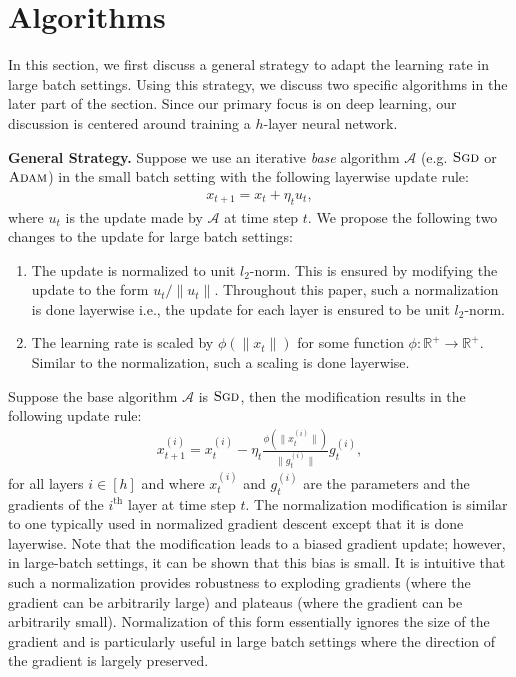 \documentclass{article} \usepackage{iclr2020_conference,times}
\newcommand{\sgd}{\textsc{Sgd}\xspace}
\newcommand{\adam}{\textsc{Adam}}
\begin{document}
\section{Algorithms}


In this section, we first discuss a general strategy to adapt the learning rate in large batch settings.  Using this strategy, we discuss two specific algorithms in the later part of the section. Since our primary focus is on deep learning, our discussion is centered around training a $h$-layer neural network.

{\bf General Strategy.} Suppose we use an iterative \emph{base} algorithm $\mathcal{A}$ (e.g. $\sgd$ or $\adam$) in the small batch setting with the following layerwise update rule:
\begin{align*}
x_{t+1} = x_t + \eta_t u_t, 
\end{align*} 
where $u_t$ is the update made by $\mathcal{A}$ at time step $t$. We propose the following two changes to the update for large batch settings:
\begin{enumerate}
\item The update is normalized to unit $l_2$-norm. This is ensured by modifying the update to the form $u_t/\|u_t\|$. Throughout this paper, such a normalization is done layerwise i.e., the update for each layer is ensured to be unit $l_2$-norm.
\item The learning rate is scaled by $\phi(\|x_t\|)$ for some function $\phi:\mathbb{R}^{+} \rightarrow \mathbb{R}^+$. Similar to the normalization, such a scaling is done layerwise.
\end{enumerate}
Suppose the base algorithm $\mathcal{A}$ is $\sgd$, then the modification results in the following update rule:
\begin{align}
x_{t+1}^{(i)} = x_t^{(i)} - \eta_t \frac{\phi(\|x_t^{(i)}\|)}{\|g_t^{(i)}\|} g_t^{(i)} ,
\end{align}
for all layers $i \in [h]$ and where $x^{(i)}_t$ and $g^{(i)}_t$ are the parameters and the gradients of the $i^{\text{th}}$ layer at time step $t$.  The normalization modification is similar to one typically used in normalized gradient descent except that it is done layerwise. Note that the modification leads to a biased gradient update; however, in large-batch settings, it can be shown that this bias is small.  It is intuitive  that such a normalization provides robustness to exploding gradients (where the gradient can be arbitrarily large) and plateaus (where the gradient can be arbitrarily small). Normalization of this form essentially ignores the size of the gradient and is particularly useful in large batch settings where the direction of the gradient is largely preserved.
\end{document}
